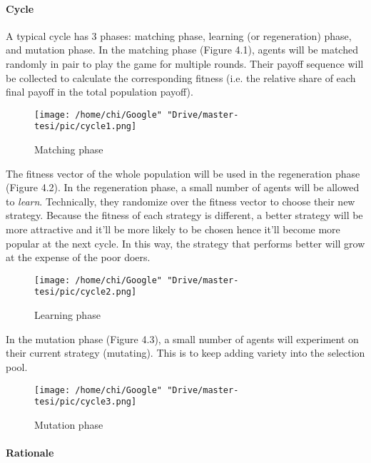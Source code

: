\documentclass[12.5pt]{report}
\begin{document}
\paragraph{Cycle}
A typical cycle has 3 phases: matching phase, learning (or regeneration) phase, and mutation phase. In the matching phase (Figure 4.1), agents will be matched randomly in pair to play the game for multiple rounds. Their payoff sequence will be collected to calculate the corresponding fitness (i.e. the relative share of each final payoff in the total population payoff). 
\begin{figure}[h!]
 \center
\texttt{[image: /home/chi/Google" "Drive/master-tesi/pic/cycle1.png]}
\caption{Matching phase}
\end{figure}
The fitness vector of the whole population will be used in the regeneration phase (Figure 4.2). In the regeneration phase, a small number of agents will be allowed to \emph{learn}. Technically, they randomize over the fitness vector to choose their new strategy. Because the fitness of each strategy is different, a better strategy will be more attractive and it'll be more likely to be chosen hence it'll become more popular at the next cycle. In this way, the strategy that performs better will grow at the expense of the poor doers. 
\begin{figure}[h!]
 \center
\texttt{[image: /home/chi/Google" "Drive/master-tesi/pic/cycle2.png]}
\caption{Learning phase}
\end{figure}
In the mutation phase (Figure 4.3), a small number of agents will experiment on their current strategy (mutating). This is to keep adding variety into the selection pool.\\

\begin{figure}[h!]
 \center
\texttt{[image: /home/chi/Google" "Drive/master-tesi/pic/cycle3.png]}
\caption{Mutation phase}
\end{figure}


\paragraph{Rationale}
\end{document}
